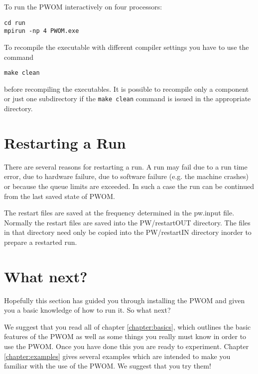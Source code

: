 To run the PWOM interactively on four processors:
\begin{verbatim}
cd run
mpirun -np 4 PWOM.exe
\end{verbatim}

To recompile the executable with different compiler settings you have
to use the command
\begin{verbatim}
make clean
\end{verbatim}
before recompiling the executables. It is possible to recompile
only a component or just one subdirectory if the {\tt make clean}
command is issued in the appropriate directory.

\section{Restarting a Run}

There are several reasons for restarting a run. A run may fail
due to a run time error, due to hardware failure, due to 
software failure (e.g. the machine crashes) or because the
queue limits are exceeded. In such a case the run can be continued from
the last saved state of PWOM. 

The restart files are saved at the frequency determined in the pw.input file.
Normally the restart files are saved into the PW/restartOUT directory. 
The files in that directory need only be copied into the PW/restartIN 
directory inorder to prepare a restarted run.

\section{What next?}

Hopefully this section has guided you through installing the PWOM and
given you a basic knowledge of how to run it.  So what next?

We suggest that you read all of chapter \ref{chapter:basics}, which
outlines the basic features of the PWOM as well as some things you
really must know in order to use the PWOM.  Once you have done this you
are ready to experiment.  Chapter \ref{chapter:examples} gives several 
examples which are intended to make you familiar with the use of the
PWOM.  We suggest that you try them!

%
